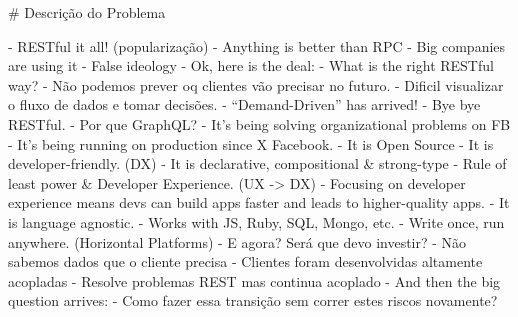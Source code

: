# Descrição do Problema

- RESTful it all! (popularização)
	- Anything is better than RPC
	- Big companies are using it
	- False ideology
- Ok, here is the deal:
	- What is the right RESTful way?
	- Não podemos prever oq clientes vão precisar no futuro.
	- Dificil visualizar o fluxo de dados e tomar decisões.
- “Demand-Driven” has arrived!
	- Bye bye RESTful.
	- Por que GraphQL?
		- It's being solving organizational problems on FB
		- It's being running on production since X Facebook.
		- It is Open Source
		- It is developer-friendly. (DX)
		  - It is declarative, compositional & strong-type
			- Rule of least power & Developer Experience. (UX -> DX)
				- Focusing on developer experience means devs can build apps faster and leads to higher-quality apps.
		- It is language agnostic.
    - Works with JS, Ruby, SQL, Mongo, etc.
    - Write once, run anywhere. (Horizontal Platforms)
- E agora? Será que devo investir?
	- Não sabemos dados que o cliente precisa
	- Clientes foram desenvolvidas altamente acopladas
	- Resolve problemas REST mas continua acoplado
- And then the big question arrives:
	- Como fazer essa transição sem correr estes riscos novamente?
